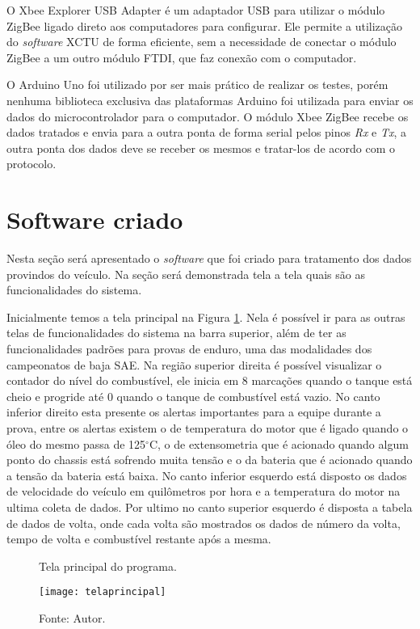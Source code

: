 O Xbee Explorer USB Adapter é um adaptador USB para utilizar o módulo ZigBee ligado direto aos computadores para configurar. Ele permite a utilização do \textit{software} XCTU de forma eficiente, sem a necessidade de conectar o módulo ZigBee a um outro módulo FTDI, que faz conexão com o computador. 

O Arduino Uno foi utilizado por ser mais prático de realizar os testes, porém nenhuma biblioteca exclusiva das plataformas Arduino foi utilizada para enviar os dados do microcontrolador para o computador. O módulo Xbee ZigBee recebe os dados tratados e envia para a outra ponta de forma serial pelos pinos \textit{Rx} e \textit{Tx}, a outra ponta dos dados deve se receber os mesmos e tratar-los de acordo com o protocolo.

\section {Software criado}
Nesta seção será apresentado o \textit{software} que foi criado para tratamento dos dados provindos do veículo. Na seção será demonstrada tela a tela quais são as funcionalidades do sistema.

Inicialmente temos a tela principal na Figura \ref{fig:telaprincipal}. Nela é possível ir para as outras telas de funcionalidades do sistema na barra superior, além de ter as funcionalidades padrões para provas de enduro, uma das modalidades dos campeonatos de baja SAE. Na região superior direita é possível visualizar o contador do nível do combustível, ele inicia em 8 marcações quando o tanque está cheio e progride até 0 quando o tanque de combustível está vazio. No canto inferior direito esta presente os alertas importantes para a equipe durante a prova, entre os alertas existem o de temperatura do motor que é ligado quando o óleo do mesmo passa de 125$^\circ$C, o de extensometria que é acionado quando algum ponto do chassis está sofrendo muita tensão e o da bateria que é acionado quando a tensão da bateria está baixa. No canto inferior esquerdo está disposto os dados de velocidade do veículo em quilômetros por hora e a temperatura do motor na ultima coleta de dados. Por ultimo no canto superior esquerdo é disposta a tabela de dados de volta, onde cada volta são mostrados os dados de número da volta, tempo de volta e combustível restante após a mesma. 

\begin{figure}[!htb]
	\centering
		\caption{Tela principal do programa.}
		\texttt{[image: telaprincipal]} 
		\caption*{Fonte: Autor.}
		\label{fig:telaprincipal}
\end{figure}    

